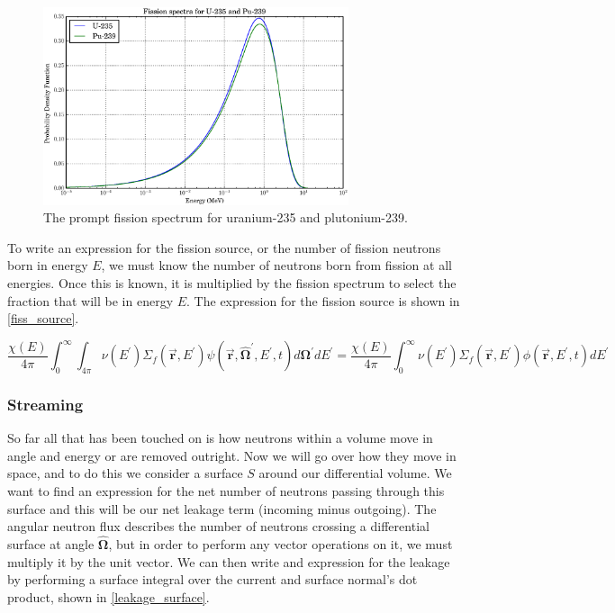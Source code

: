 \begin{figure}[h!] 
  \centering
    \includegraphics[width=0.8\textwidth ]{graphics/fiss_spec.eps} 
     \caption{The prompt fission spectrum for uranium-235 and plutonium-239. \label{fiss_spec}}
\end{figure}

To write an expression for the fission source, or the number of fission neutrons born in energy $E$, we must know the number of neutrons born from fission at all energies.  Once this is known, it is multiplied by the fission spectrum to select the fraction that will be in energy $E$.  The expression for the fission source is shown in \eqref{fiss_source}.

\begin{equation}
\label{fiss_source}
\frac{\chi(E)}{4\pi} \int_0^\infty  \int_{4\pi}   \nu(E^\prime) \Sigma_f(\boldsymbol{\vec{r}},E^\prime) \psi(\boldsymbol{\vec{r}},\boldsymbol{\hat{\Omega}}^\prime,E^\prime,t) d\boldsymbol{\Omega}^\prime  dE^\prime = \frac{\chi(E)}{4\pi} \int_0^\infty   \nu(E^\prime) \Sigma_f(\boldsymbol{\vec{r}},E^\prime) \phi(\boldsymbol{\vec{r}},E^\prime,t)  dE^\prime
 \end{equation}


\subsubsection{Streaming}

So far all that has been  touched on is how neutrons within a volume move in angle and energy or are removed outright.  Now we will go over how they move in space, and to do this we consider a surface $S$ around our differential volume.  We want to find an expression for the net number of neutrons passing through this surface and this will be our net leakage term (incoming minus outgoing).  The angular neutron flux describes the number of neutrons crossing a differential surface at angle $\boldsymbol{\hat{\Omega}}$, but in order to perform any vector operations on it, we must multiply it by the unit vector.  We can then write and expression for the leakage by performing a surface integral over the current and surface normal's dot product, shown in \eqref{leakage_surface}.

